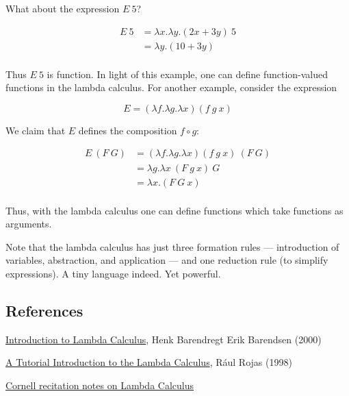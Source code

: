 What about the expression $E\ 5$?

\begin{align}
 E\ 5 &= \lambda x. \lambda y. (2x + 3y)\ 5\\
  &= \lambda y . (10 + 3y) \\
\end{align}

Thus $E\ 5$ is function.  In light of this example, one can define function-valued functions in the lambda calculus.  For another example, consider the expression

$$
E = (\lambda f . \lambda g . \lambda x)(f\ g\ x)
$$

We claim that $E$ defines the composition $f\circ g$:

\begin{align}
E\ (F\ G) &= (\lambda f . \lambda g . \lambda x)(f\ g\ x)\ (F\ G) \\
&= \lambda g . \lambda x\ (F\ g\ x)\ G \\
&= \lambda x . (F\ G\ x) \\
\end{align}

Thus, with the lambda calculus one can define functions which take functions as arguments.

Note that the lambda calculus has just three formation rules — introduction of variables, abstraction, and application — and one reduction rule (to simplify expressions). A tiny language indeed.  Yet powerful.

\subsection{References}

\href{http://www.cse.chalmers.se/research/group/logic/TypesSS05/Extra/geuvers.pdf}{Introduction to Lambda Calculus}, Henk Barendregt Erik Barendsen (2000)

\href{https://www.inf.fu-berlin.de/lehre/WS03/alpi/lambda.pdf}{A Tutorial Introduction to the Lambda Calculus}, Rául Rojas (1998)

\href{http://www.cs.cornell.edu/courses/cs312/2008sp/recitations/rec26.html}{Cornell recitation notes on Lambda Calculus}
